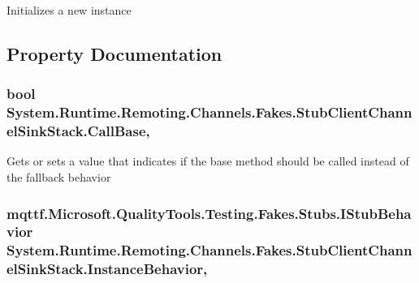 Initializes a new instance



\subsection{Property Documentation}
\hypertarget{class_system_1_1_runtime_1_1_remoting_1_1_channels_1_1_fakes_1_1_stub_client_channel_sink_stack_aeb5c0d4ce6c1e5e90fb69d96b70cd7ca}{
\subsubsection[{Call\-Base}]{\setlength{\rightskip}{0pt plus 5cm}bool System.\-Runtime.\-Remoting.\-Channels.\-Fakes.\-Stub\-Client\-Channel\-Sink\-Stack.\-Call\-Base\hspace{0.3cm}{\ttfamily [get]}, {\ttfamily [set]}}}\label{class_system_1_1_runtime_1_1_remoting_1_1_channels_1_1_fakes_1_1_stub_client_channel_sink_stack_aeb5c0d4ce6c1e5e90fb69d96b70cd7ca}


Gets or sets a value that indicates if the base method should be called instead of the fallback behavior

\hypertarget{class_system_1_1_runtime_1_1_remoting_1_1_channels_1_1_fakes_1_1_stub_client_channel_sink_stack_abac70930c886b2202ce5e27b0a60e5f3}{
\subsubsection[{Instance\-Behavior}]{\setlength{\rightskip}{0pt plus 5cm}mqttf.\-Microsoft.\-Quality\-Tools.\-Testing.\-Fakes.\-Stubs.\-I\-Stub\-Behavior System.\-Runtime.\-Remoting.\-Channels.\-Fakes.\-Stub\-Client\-Channel\-Sink\-Stack.\-Instance\-Behavior\hspace{0.3cm}{\ttfamily [get]}, {\ttfamily [set]}}}\label{class_system_1_1_runtime_1_1_remoting_1_1_channels_1_1_fakes_1_1_stub_client_channel_sink_stack_abac70930c886b2202ce5e27b0a60e5f3}


